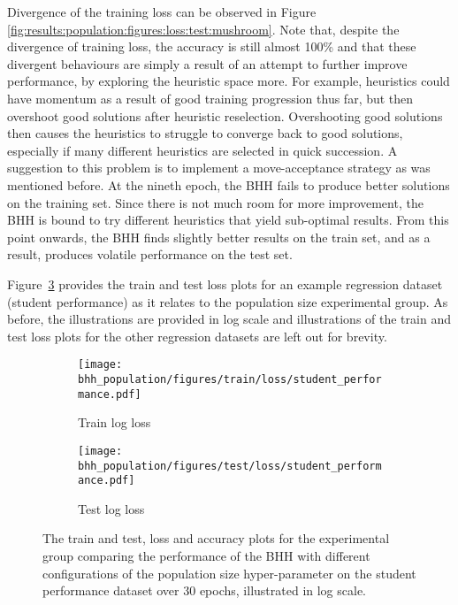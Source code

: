 Divergence of the training loss can be observed in Figure \ref{fig:results:population:figures:loss:test:mushroom}. Note that, despite the divergence of training loss, the accuracy is still almost 100\% and that these divergent behaviours are simply a result of an attempt to further improve performance, by exploring the heuristic space more. For example, heuristics could have momentum as a result of good training progression thus far, but then overshoot good solutions after heuristic reselection. Overshooting good solutions then causes the heuristics to struggle to converge back to good solutions, especially if many different heuristics are selected in quick succession. A suggestion to this problem is to implement a move-acceptance strategy as was mentioned before. At the nineth epoch, the \acs{BHH} fails to produce better solutions on the training set. Since there is not much room for more improvement, the \acs{BHH} is bound to try different heuristics that yield sub-optimal results. From this point onwards, the \acs{BHH} finds slightly better results on the train set, and as a result, produces volatile performance on the test set.

Figure~\ref{fig:results:population:figures:student_performance} provides the train and test loss plots for an example regression dataset (student performance) as it relates to the population size experimental group. As before, the illustrations are provided in log scale and illustrations of the train and test loss plots for the other regression datasets are left out for brevity.

\begin{figure}[htbp]
	\begin{subfigure}{0.5\textwidth}
		\centering
		\texttt{[image: bhh\_population/figures/train/loss/student\_performance.pdf]}
		\caption{Train log loss}
		\label{fig:results:population:figures:loss:train:student_performance}
	\end{subfigure}
	\begin{subfigure}{0.5\textwidth}
		\centering
		\texttt{[image: bhh\_population/figures/test/loss/student\_performance.pdf]}
		\caption{Test log loss}
		\label{fig:results:population:figures:loss:test:student_performance}
	\end{subfigure}
	\par\bigskip
	\caption{The train and test, loss and accuracy plots for the experimental group comparing the performance of the \acs{BHH} with different configurations of the population size hyper-parameter on the student performance dataset over 30 epochs, illustrated in log scale.}
	\label{fig:results:population:figures:student_performance}
\end{figure}


